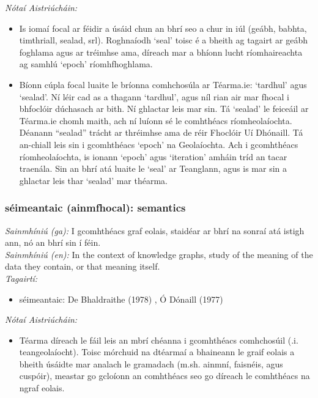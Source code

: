 \documentclass{article}
\begin{document}
 \noindent \textit{Nótaí Aistriúcháin:}
\begin{itemize}
	\item Is iomaí focal ar féidir a úsáid chun an bhrí seo a chur in iúl (geábh, babhta, timthriall, sealad, srl). Roghnaíodh `seal' toisc é a bheith ag tagairt ar geábh foghlama agus ar tréimhse ama, díreach mar a bhíonn lucht ríomhaireachta ag samhlú `epoch' ríomhfhoghlama.
	\item Bíonn cúpla focal luaite le bríonna comhchosúla ar Téarma.ie: `tardhul' agus `sealad'. Ní léir cad as a thagann `tardhul', agus níl rian air mar fhocal i bhfoclóir dúchasach ar bith. Ní ghlactar leis mar sin. Tá `sealad' le feiceáil ar Téarma.ie chomh maith, ach ní luíonn sé le comhthéacs ríomheolaíochta. Déanann “sealad” trácht ar thréimhse ama de réir Fhoclóir Uí Dhónaill. Tá an-chiall leis sin i gcomhthéacs `epoch' na Geolaíochta. Ach i gcomhthéacs ríomheolaíochta, is ionann `epoch' agus `iteration' amháin tríd an tacar traenála. Sin an bhrí atá luaite le `seal' ar Teanglann, agus is mar sin a ghlactar leis thar `sealad' mar théarma.
\end{itemize}


\subsubsection*{séimeantaic (ainmfhocal): semantics}
 \noindent \textit{Sainmhíniú (ga):} I gcomhthéacs graf eolais, staidéar ar bhrí na sonraí atá istigh ann, nó an bhrí sin í féin.
\\
 \noindent \textit{Sainmhíniú (en):} In the context of knowledge graphs, study of the meaning of the data they contain, or that meaning itself.
\\
 \noindent \textit{Tagairtí:}
\begin{itemize}
	\item séimeantaic: De Bhaldraithe (1978) \cite{de-bhaldraithe}, Ó Dónaill (1977) \cite{odonaill}
\end{itemize}

 \noindent \textit{Nótaí Aistriúcháin:}
\begin{itemize}
	\item Téarma díreach le fáil leis an mbrí chéanna i gcomhthéacs comhchosúil (.i. teangeolaíocht). Toisc mórchuid na dtéarmaí a bhaineann le graif eolais a bheith úsáidte mar analach le gramadach (m.sh. ainmní, faisnéis, agus cuspóir), meastar go gcloíonn an comhthéacs seo go díreach le comhthéacs na ngraf eolais.
\end{itemize}
\end{document}
